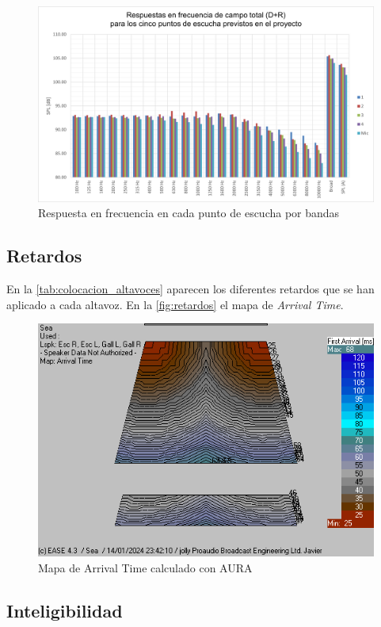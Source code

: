 \documentclass{article}
\begin{document}
\begin{figure}[hbtp]
    \centering
    \includegraphics[width=\linewidth]{Para la memoria/EQ 2.png}
    \caption{Respuesta en frecuencia en cada punto de escucha por bandas}
    \label{fig:EQ_2}
\end{figure}


\subsection{Retardos}

En la \autoref{tab:colocacion_altavoces} aparecen los diferentes retardos que se han aplicado a cada altavoz. En la \autoref{fig:retardos} el mapa de \textit{Arrival Time}.

\begin{figure}[hbtp]
    \centering
    \includegraphics[width=0.7\linewidth]{Para la memoria/Arrival time AURA.png}
    \caption{Mapa de Arrival Time calculado con AURA}
    \label{fig:retardos}
\end{figure}

\subsection{Inteligibilidad}
\end{document}

